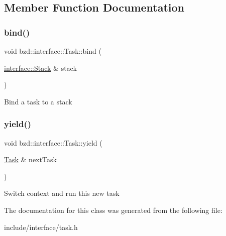\subsection{Member Function Documentation}
\mbox{\label{classbzd_1_1interface_1_1Task_a8a1ac60ed1c1a1c2db3e4e11035b5488}} 
\subsubsection{\texorpdfstring{bind()}{bind()}}
{\footnotesize\ttfamily void bzd\+::interface\+::\+Task\+::bind (\begin{DoxyParamCaption}\item[{\hyperlink{classbzd_1_1interface_1_1Stack}{interface\+::\+Stack} \&}]{stack }\end{DoxyParamCaption})\hspace{0.3cm}{\ttfamily [inline]}}

Bind a task to a stack \mbox{\label{classbzd_1_1interface_1_1Task_a262c01237a7cb301d6c3b493474c44ea}} 
\subsubsection{\texorpdfstring{yield()}{yield()}}
{\footnotesize\ttfamily void bzd\+::interface\+::\+Task\+::yield (\begin{DoxyParamCaption}\item[{\hyperlink{classbzd_1_1interface_1_1Task}{Task} \&}]{next\+Task }\end{DoxyParamCaption})\hspace{0.3cm}{\ttfamily [inline]}}

Switch context and run this new task 

The documentation for this class was generated from the following file\+:\begin{DoxyCompactItemize}
\item 
include/interface/task.\+h\end{DoxyCompactItemize}
